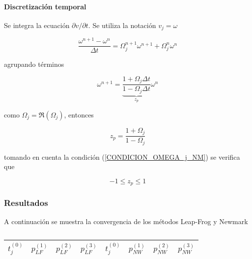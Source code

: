 \paragraph{Discretización temporal}

Se integra la ecuación $\partial v / \partial t$. Se utiliza la notación $v_j = \omega$

\begin{equation}
\dfrac{\omega^{n+1}-\omega^n}{\Delta t} = \Omega_j^{n+1} \omega^{n+1} + \Omega_j^{n} \omega^{n}
\end{equation}

agrupando términos

\begin{equation}
\omega^{n+1} = \underbrace{ \dfrac{1+\Omega_j \Delta t}{1-\Omega_j \Delta t} }_{z_p} \omega^n
\end{equation}

como $\Omega_j = \Re(\Omega_j)$, entonces

\begin{equation} \label{zp_nm_v}
z_p = \dfrac{ 1 + \Omega_j }{ 1-\Omega_j}
\end{equation}

tomando en cuenta la condición (\ref{CONDICION_OMEGA_j_NM}) se verifica que

\begin{equation}
-1 \leq z_p \leq 1
\end{equation}

\subsubsection{Resultados}
A continuación se muestra la convergencia de los métodos Leap-Frog y Newmark
\begin{table} [H]
\begin{center}
\begin{tabular}{|llll|llll|} \hline
$t_j^{(0)}$ & $p_{LF}^{(1)}$ & $p_{LF}^{(2)}$ & $p_{LF}^{(3)}$ & $t_j^{(0)}$ & $p_{NW}^{(1)}$ & $p_{NW}^{(2)}$ & $p_{NW}^{(3)}$  \\ \hline
 \hline
\end{tabular}
\caption{} \label{tabla_lf_nm}
\end{center}
\end{table}


